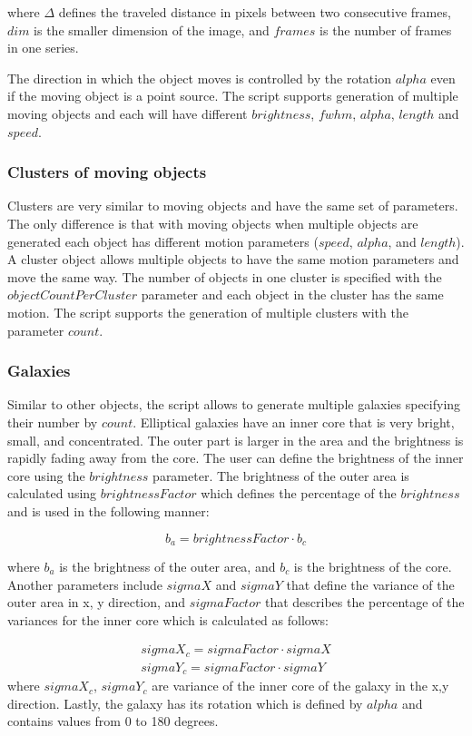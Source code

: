 where $\Delta$ defines the traveled distance in pixels between two consecutive frames, $dim$ is the smaller dimension of the image, and $frames$ is the number of frames in one series. 

The direction in which the object moves is controlled by the rotation $alpha$ even if the moving object is a point source. The script supports generation of multiple moving objects and each will have different $brightness$, $fwhm$, $alpha$, $length$ and $speed$. 


\subsubsection{Clusters of moving objects}
Clusters are very similar to moving objects and have the same set of parameters. The only difference is that with moving objects when multiple objects are generated each object has different motion parameters ($speed$, $alpha$, and $length$). A cluster object allows multiple objects to have the same motion parameters and move the same way. The number of objects in one cluster is specified with the $objectCountPerCluster$ parameter and each object in the cluster has the same motion. The script supports the generation of multiple clusters with the parameter $count$.   

\subsubsection{Galaxies}
Similar to other objects, the script allows to generate multiple galaxies specifying their number by $count$. Elliptical galaxies have an inner core that is very bright, small, and concentrated. The outer part is larger in the area and the brightness is rapidly fading away from the core. The user can define the brightness of the inner core using the $brightness$ parameter. The brightness of the outer area is calculated using $brightnessFactor$ which defines the percentage of the $brightness$ and is used in the following manner: 

\begin{equation} \label{eq:brightnessGalaxy}
    b_a = brightnessFactor \cdot b_c
\end{equation}

where $b_a$ is the brightness of the outer area, and $b_c$ is the brightness of the core. 
Another parameters include $sigmaX$ and $sigmaY$ that define the variance of the outer area in x, y direction, and $sigmaFactor$ that describes the percentage of the variances for the inner core which is calculated as follows: 

\begin{equation} \label{eq:sigmaGalaxy}
    \begin{split}
        sigmaX_c = sigmaFactor \cdot sigmaX \\
        sigmaY_c = sigmaFactor \cdot sigmaY
    \end{split}
\end{equation}
where $sigmaX_c$, $sigmaY_c$ are variance of the inner core of the galaxy in the x,y direction. 
Lastly, the galaxy has its rotation which is defined by $alpha$ and contains values from 0 to 180 degrees. 

